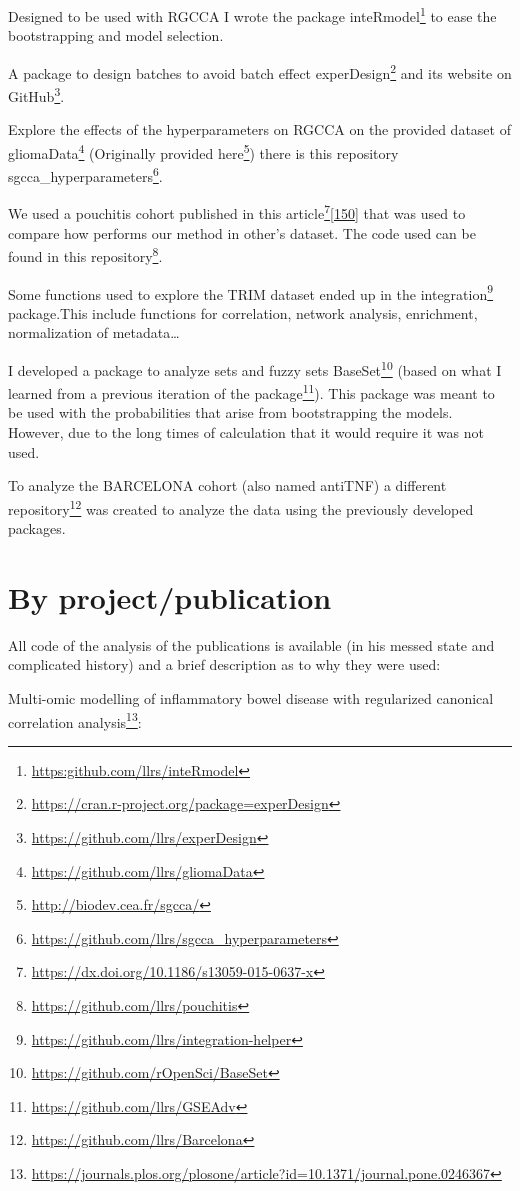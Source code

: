 \documentclass[
  a4paper,
]{book}
\DeclareRobustCommand{\href}[2]{#2\footnote{\url{#1}}}
\begin{document}
Designed to be used with RGCCA I wrote the package \href{https:github.com/llrs/inteRmodel}{inteRmodel} to ease the bootstrapping and model selection.

A package to design batches to avoid batch effect \href{https://cran.r-project.org/package=experDesign}{experDesign} and its website on \href{https://github.com/llrs/experDesign}{GitHub}.

Explore the effects of the hyperparameters on RGCCA on the provided dataset of \href{https://github.com/llrs/gliomaData}{gliomaData} (Originally provided \href{http://biodev.cea.fr/sgcca/}{here}) there is this repository \href{https://github.com/llrs/sgcca_hyperparameters}{sgcca\_hyperparameters}.

We used a pouchitis cohort published in this \href{https://dx.doi.org/10.1186/s13059-015-0637-x}{article}{[}\protect\hyperlink{ref-morgan2015}{150}{]} that was used to compare how performs our method in other's dataset.
The code used can be found in \href{https://github.com/llrs/pouchitis}{this repository}.

Some functions used to explore the TRIM dataset ended up in the \href{https://github.com/llrs/integration-helper}{integration} package.This include functions for correlation, network analysis, enrichment, normalization of metadata\ldots{}

I developed a package to analyze sets and fuzzy sets \href{https://github.com/rOpenSci/BaseSet}{BaseSet} (based on what I learned from a previous iteration of the \href{https://github.com/llrs/GSEAdv}{package}).
This package was meant to be used with the probabilities that arise from bootstrapping the models.
However, due to the long times of calculation that it would require it was not used.

To analyze the BARCELONA cohort (also named antiTNF) a \href{https://github.com/llrs/Barcelona}{different repository} was created to analyze the data using the previously developed packages.

\hypertarget{by-projectpublication}{%
\section{By project/publication}\label{by-projectpublication}}

All code of the analysis of the publications is available (in his messed state and complicated history) and a brief description as to why they were used:

\href{https://journals.plos.org/plosone/article?id=10.1371/journal.pone.0246367}{Multi-omic modelling of inflammatory bowel disease with regularized canonical correlation analysis}:
\end{document}
